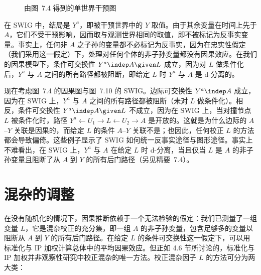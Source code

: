 \begin{figure}[htbp]
\centering
{}
\caption{由图~7.4 得到的单世界干预图}
\label{fig:7.10}
\end{figure}

在 SWIG 中，结局是 $Y^{a}$，即被干预世界中的 $Y$ 取值。由于其余变量在时间上先于 $A$，它们不受干预影响，因而取与观测世界相同的取值，即不被标记为反事实变量。事实上，任何非 $A$ 之子孙的变量都不必标记为反事实，因为在忠实性假定（我们采用这一假定）下，处理对任何个体的非子孙变量都没有因果效应。在我们的因果模型下，条件可交换性 $Y^{a}\indep A\given L$ 成立，因为对 $L$ 做条件化后，$Y^{a}$ 与 $A$ 之间的所有路径都被阻断，即给定 $L$ 时 $Y^{a}$ 与 $A$ 是 d-分离的。

现在考虑图~7.4 的因果图与图~7.10 的 SWIG。边际可交换性 $Y^{a}\indep A$ 成立，因为在 SWIG 上，$Y^{a}$ 与 $A$ 之间的所有路径都被阻断（未对 $L$ 做条件化）。相反，条件可交换性 $Y^{a}\indep A\given L$ 不成立，因为在 SWIG 上，当对撞节点 $L$ 被条件化时，路径 $Y^{a}\leftarrow U_1\to L\leftarrow U_2\to A$ 是开放的。这就是为什么边际的 $A$–$Y$ 关联是因果的，而给定 $L$ 的条件 $A$–$Y$ 关联不是；也因此，任何校正 $L$ 的方法都会导致偏倚。这些例子显示了 SWIG 如何统一反事实途径与图形途径。事实上不难看出，在 SWIG 上，$Y^{a}$ 与 $A$ 在给定 $L$ 时 d-分离，当且仅当 $L$ 是 $A$ 的非子孙变量且阻断了从 $A$ 到 $Y$ 的所有后门路径（另见精要~7.4）。

\section{混杂的调整}

在没有随机化的情况下，因果推断依赖于一个无法检验的假定：我们已测量了一组变量 $L$，它是混杂校正的充分集，即一组 $A$ 的非子孙变量，包含足够多的变量以阻断从 $A$ 到 $Y$ 的所有后门路径。在给定 $L$ 的条件可交换性这一假定下，可以用标准化与 IP 加权计算总体中的平均因果效应。但正如 4.6 节所讨论的，标准化与 IP 加权并非观察性研究中校正混杂的唯一方法。校正混杂因子 $L$ 的方法可分为两大类：

